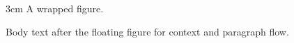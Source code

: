 \documentclass{article}
\begin{document}
\begin{floatingfigure}{3cm}
A wrapped figure.
\end{floatingfigure}
Body text after the floating figure for context and paragraph flow.
\end{document}
